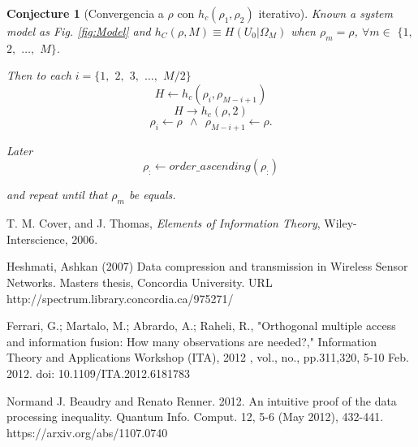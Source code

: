 \documentclass[a4paper,10pt]{article}
\newtheorem{conjecture}[mytheorem]{Conjecture}
\begin{document}
\begin{mdframed}[style=MDFStyGrayScreen]
\begin{conjecture}[Convergencia a $\rho$ con $h_c(\rho_1,\rho_2)$ iterativo]
 \label{lemm:h0OmegaM_hc2}
 Known a system model as Fig. \ref{fig:Model} and $h_{C}(\rho,M)\equiv H(U_0|\Omega_M)$ 
 when $\rho_m=\rho$, $\forall m \in $ $\{1,$ $2,$ $\dots,$ $M\}$.
 
 Then to each $i=\{1,$ $2,$ $3,$ $\dots,$ $M/2\}$
\begin{equation}\label{eq:HconjectureHc2_1}
H \leftarrow h_c(\rho_{i},\rho_{M-i+1})
\end{equation}
\begin{equation}\label{eq:HconjectureHc2_2}
H \rightarrow h_c(\rho,2)
\end{equation}
\begin{equation}\label{eq:HconjectureHc2_3}
\rho_{i} \leftarrow \rho ~~\wedge~~ \rho_{M-i+1} \leftarrow \rho .
\end{equation}

Later
\begin{equation}\label{eq:HconjectureHc2_4}
\rho_{:} \leftarrow order\_ascending(\rho_{:})
\end{equation}

and repeat until that $\rho_m$ be equals.
\end{conjecture}
\end{mdframed}




\begin{thebibliography}{99}
T. M. Cover, and J. Thomas, \textit{Elements of Information Theory}, Wiley-Interscience, 2006.

Heshmati, Ashkan   (2007) Data compression and transmission in Wireless Sensor Networks.  
Masters thesis, Concordia University. URL http://spectrum.library.concordia.ca/975271/ 
  
Ferrari, G.; Martalo, M.; Abrardo, A.; Raheli, R., "Orthogonal multiple 
access and information fusion: How many observations are needed?," 
Information Theory and Applications Workshop (ITA), 2012 , vol., no., 
pp.311,320, 5-10 Feb. 2012. doi: 10.1109/ITA.2012.6181783
  
Normand J. Beaudry and Renato Renner. 2012. An intuitive proof of the data processing inequality. 
Quantum Info. Comput. 12, 5-6 (May 2012), 432-441. https://arxiv.org/abs/1107.0740

\end{thebibliography}
\end{document}
